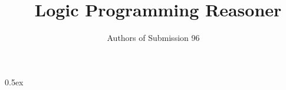 \documentclass[12pt,a4paper,fleqn]{article}
\begin{document}
\title{\xphi~Logic Programming Reasoner}
\author{Authors of Submission 96}
\maketitle

\parindent 0pt\parskip 0.5ex



%
%
\end{document}
